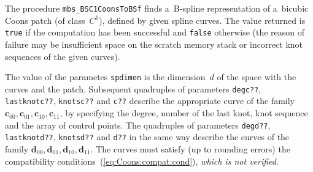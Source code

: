\vspace{\bigskipamount}
The procedure \texttt{mbs\_BSC1CoonsToBSf} finds a~B-spline representation
of a~bicubic Coons patch (of class~$C^1$), defined by given spline curves.
The value returned is \texttt{true} if the computation has been successful
and \texttt{false} otherwise (the reason of failure may be insufficient space
on the scratch memory stack or incorrect knot sequences of the given curves).

The value of the parametes \texttt{spdimen} is the dimension~$d$ of the space
with the curves and the patch. Subsequent quadruples of parameters
\texttt{degc??}, \texttt{lastknotc??}, \texttt{knotsc??} and \texttt{c??}
describe the appropriate curve of the family
$\bm{c}_{00},\bm{c}_{01},\bm{c}_{10},\bm{c}_{11}$, by specifying the degree,
number of the last knot, knot sequence and the array of control points.
The quadruples of parameters \texttt{degd??}, \texttt{lastknotd??},
\texttt{knotsd??} and \texttt{d??} in the same way describe the curves
of the family $\bm{d}_{00},\bm{d}_{01},\bm{d}_{10},\bm{d}_{11}$.
The curves must satisfy (up to rounding errors) the compatibility
conditions~(\ref{eq:Coons:compat:cond}), \emph{which is not verified}.

